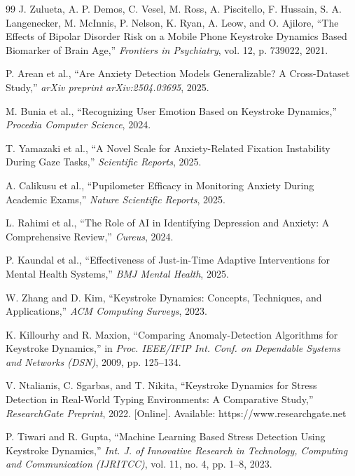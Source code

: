 \documentclass[a4paper,11pt]{report}
\begin{document}
\begin{thebibliography}{99}
 J. Zulueta, A. P. Demos, C. Vesel, M. Ross, A. Piscitello, F. Hussain, S. A. Langenecker, M. McInnis, P. Nelson, K. Ryan, A. Leow, and O. Ajilore, ``The Effects of Bipolar Disorder Risk on a Mobile Phone Keystroke Dynamics Based Biomarker of Brain Age,'' \emph{Frontiers in Psychiatry}, vol. 12, p. 739022, 2021. 

 P. Arean et al., ``Are Anxiety Detection Models Generalizable? A Cross-Dataset Study,'' \emph{arXiv preprint arXiv:2504.03695}, 2025.

 M. Bunia et al., ``Recognizing User Emotion Based on Keystroke Dynamics,'' \emph{Procedia Computer Science}, 2024. 

 T. Yamazaki et al., ``A Novel Scale for Anxiety-Related Fixation Instability During Gaze Tasks,'' \emph{Scientific Reports}, 2025. 

 A. Calikusu et al., ``Pupilometer Efficacy in Monitoring Anxiety During Academic Exams,'' \emph{Nature Scientific Reports}, 2025. 

 L. Rahimi et al., ``The Role of AI in Identifying Depression and Anxiety: A Comprehensive Review,'' \emph{Cureus}, 2024. 

 P. Kaundal et al., ``Effectiveness of Just-in-Time Adaptive Interventions for Mental Health Systems,'' \emph{BMJ Mental Health}, 2025. 

 W. Zhang and D. Kim, ``Keystroke Dynamics: Concepts, Techniques, and Applications,'' \emph{ACM Computing Surveys}, 2023.

 K. Killourhy and R. Maxion, ``Comparing Anomaly-Detection Algorithms for Keystroke Dynamics,'' in \emph{Proc. IEEE/IFIP Int. Conf. on Dependable Systems and Networks (DSN)}, 2009, pp. 125--134.

 V. Ntalianis, C. Sgarbas, and T. Nikita, ``Keystroke Dynamics for Stress Detection in Real-World Typing Environments: A Comparative Study,'' \emph{ResearchGate Preprint}, 2022. [Online]. Available: https://www.researchgate.net

 P. Tiwari and R. Gupta, ``Machine Learning Based Stress Detection Using Keystroke Dynamics,'' \emph{Int. J. of Innovative Research in Technology, Computing and Communication (IJRITCC)}, vol. 11, no. 4, pp. 1--8, 2023.


\end{thebibliography}
\end{document}
